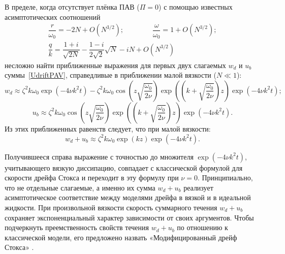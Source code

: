 В пределе, когда отсутствует плёнка ПАВ ($ \Pi=0 $) с помощью известных асимптотических соотношений \parencite{BelonozhkoKozin2009}
\begin{gather*}
\dfrac{r}{\omega_{0}}=-2 N + O \left( N^{3/2} \right); \qquad \qquad \dfrac{\omega}{\omega_{0}}=1+O \left( N^{3/2} \right);\\
\dfrac{q}{k}=\dfrac{1+i}{\sqrt{2 N}}-\dfrac{1-i}{2 \sqrt{2}}\sqrt{N}-i N +O \left( N^{3/2} \right)
\end{gather*}
несложно найти приближенные выражения для первых двух слагаемых $ w_{d} $ и $ u_{b} $ суммы~\eqref{UdriftPAV}, справедливые в приближении малой вязкости ($ N\ll 1 $):
\begin{equation*}
w_{d}\approx \zeta^{2} k \omega_{0} \exp \left( - 4 \nu k^{2} t \right) - \zeta^{2} k \omega_{0} \cos \left( z \sqrt{\dfrac{\omega_{0}}{2 \nu}} \right) \exp \left( \left( k+ \sqrt{\dfrac{\omega_{0}}{2 \nu}} \right) z \right) \exp \left( - 4 \nu k^{2} t \right);
\end{equation*}
\begin{equation*}
u_{b}\approx \zeta^{2} k \omega_{0} \cos \left( z \sqrt{\dfrac{\omega_{0}}{2 \nu}} \right) \exp \left( \left( k+ \sqrt{\dfrac{\omega_{0}}{2 \nu}}\right) z \right) \exp \left( - 4 \nu k^{2} t \right).
\end{equation*}
Из этих приближенных равенств следует, что при малой вязкости:
\begin{equation*}
w_{d}+u_{b} \approx \zeta^{2} k \omega_{0} \exp \left( k z \right) \exp \left( - 4 \nu k^{2} t \right).
\end{equation*}

Получившееся справа выражение с точностью до множителя $ \exp \left( - 4 \nu k^{2} t \right) $, учитывающего вязкую диссипацию, совпадает с классической формулой для скорости дрейфа Стокса и переходит в эту формулу при $ \nu=0 $. Принципиально, что не отдельные слагаемые, а именно их сумма $ w_{d}+u_{b} $ реализует асимптотическое соответствие между моделями дрейфа в вязкой и в идеальной жидкости. При произвольной вязкости скорость суммарного течения $ w_{d}+u_{b} $ сохраняет экспоненциальный характер зависимости от своих аргументов. Чтобы подчеркнуть преемственность свойств течения $ w_{d}+u_{b} $ по отношению к классической модели, его предложено назвать «Модифицированный дрейф Стокса» \parencite{BelonozhkoZHTF}. 

